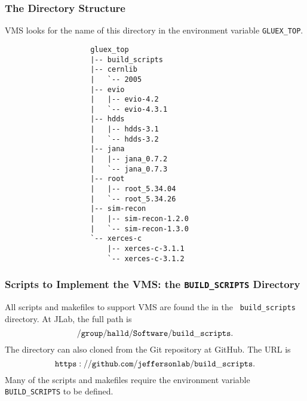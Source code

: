 \documentclass[xcolor=dvipsnames,hyperref={pdfpagelabels=false}]{beamer}
\begin{document}
\begin{frame}[fragile]
  \frametitle{The Directory Structure}

VMS looks for the name of this directory in the environment variable {\tt GLUEX\_TOP}.

\begin{verbatim}
                    gluex_top
                    |-- build_scripts
                    |-- cernlib
                    |   `-- 2005
                    |-- evio
                    |   |-- evio-4.2
                    |   `-- evio-4.3.1
                    |-- hdds
                    |   |-- hdds-3.1
                    |   `-- hdds-3.2
                    |-- jana
                    |   |-- jana_0.7.2
                    |   `-- jana_0.7.3
                    |-- root
                    |   |-- root_5.34.04
                    |   `-- root_5.34.26
                    |-- sim-recon
                    |   |-- sim-recon-1.2.0
                    |   `-- sim-recon-1.3.0
                    `-- xerces-c
                        |-- xerces-c-3.1.1
                        `-- xerces-c-3.1.2
\end{verbatim}

\end{frame}
\begin{frame}
  \frametitle{Scripts to Implement the VMS: the {\tt BUILD\_SCRIPTS} Directory}

All scripts and makefiles to support VMS are found the in the {\tt
  build\_scripts} directory. At JLab, the full path is
$${\tt /group/halld/Software/build\_scripts}.$$
The directory can also cloned from the Git repository at GitHub. The URL is
$${\tt https://github.com/jeffersonlab/build\_scripts}.$$
Many of the scripts and makefiles require the environment variable {\tt BUILD\_SCRIPTS} to be defined.

\end{frame}
\end{document}
